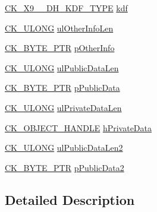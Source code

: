 \begin{DoxyCompactItemize}
\item 
\hyperlink{pkcs11t_8h_a24f6d64f6b795fc778901d99e4126bde}{C\+K\+\_\+\+X9\+\_\+\_\+\+D\+H\+\_\+\+K\+D\+F\+\_\+\+T\+Y\+PE} \hyperlink{struct_c_k___x9__42___d_h2___d_e_r_i_v_e___p_a_r_a_m_s_a6d3cf6b96eda8e41dc4c6db2abd81349}{kdf}
\item 
\hyperlink{pkcs11t_8h_a35181858a3b7a0a81f49d180d8f446ef}{C\+K\+\_\+\+U\+L\+O\+NG} \hyperlink{struct_c_k___x9__42___d_h2___d_e_r_i_v_e___p_a_r_a_m_s_a3bf3945ee7b383dfbe685b21889a81ab}{ul\+Other\+Info\+Len}
\item 
\hyperlink{pkcs11t_8h_a3d7233a4077fbaf7ae76b64da0a62a21}{C\+K\+\_\+\+B\+Y\+T\+E\+\_\+\+P\+TR} \hyperlink{struct_c_k___x9__42___d_h2___d_e_r_i_v_e___p_a_r_a_m_s_a89a408d59508d860d85d3bdabe795032}{p\+Other\+Info}
\item 
\hyperlink{pkcs11t_8h_a35181858a3b7a0a81f49d180d8f446ef}{C\+K\+\_\+\+U\+L\+O\+NG} \hyperlink{struct_c_k___x9__42___d_h2___d_e_r_i_v_e___p_a_r_a_m_s_aa0febd1df79f3897d0f54874862d0617}{ul\+Public\+Data\+Len}
\item 
\hyperlink{pkcs11t_8h_a3d7233a4077fbaf7ae76b64da0a62a21}{C\+K\+\_\+\+B\+Y\+T\+E\+\_\+\+P\+TR} \hyperlink{struct_c_k___x9__42___d_h2___d_e_r_i_v_e___p_a_r_a_m_s_a4e56e3e9f4edb37ade17e8c3ac34f816}{p\+Public\+Data}
\item 
\hyperlink{pkcs11t_8h_a35181858a3b7a0a81f49d180d8f446ef}{C\+K\+\_\+\+U\+L\+O\+NG} \hyperlink{struct_c_k___x9__42___d_h2___d_e_r_i_v_e___p_a_r_a_m_s_a3247f97e7f094da2808e5a398c4573af}{ul\+Private\+Data\+Len}
\item 
\hyperlink{pkcs11t_8h_ad1cdd703196214cd34e6f9f52bc67683}{C\+K\+\_\+\+O\+B\+J\+E\+C\+T\+\_\+\+H\+A\+N\+D\+LE} \hyperlink{struct_c_k___x9__42___d_h2___d_e_r_i_v_e___p_a_r_a_m_s_af7f9986bdf98412d3dcfff901392afb9}{h\+Private\+Data}
\item 
\hyperlink{pkcs11t_8h_a35181858a3b7a0a81f49d180d8f446ef}{C\+K\+\_\+\+U\+L\+O\+NG} \hyperlink{struct_c_k___x9__42___d_h2___d_e_r_i_v_e___p_a_r_a_m_s_ac76cae55438971946095a6d59ddfe376}{ul\+Public\+Data\+Len2}
\item 
\hyperlink{pkcs11t_8h_a3d7233a4077fbaf7ae76b64da0a62a21}{C\+K\+\_\+\+B\+Y\+T\+E\+\_\+\+P\+TR} \hyperlink{struct_c_k___x9__42___d_h2___d_e_r_i_v_e___p_a_r_a_m_s_a9a073b51cd21a777a3acf6df9d759bd4}{p\+Public\+Data2}
\end{DoxyCompactItemize}


\subsection{Detailed Description}


